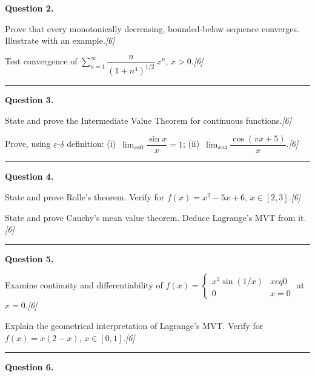 \documentclass[11pt,a4paper]{article}
\newcommand{\pts}[1]{\hfill   \textit{[#1]}}
\begin{document}
\noindent   \textbf{Question 2.}

\begin{parts}
  \item Prove that every monotonically decreasing, bounded-below sequence converges. Illustrate with an example.\pts{6}
  \item Test convergence of $\displaystyle\sum_{n=1}^{\infty}\dfrac{n}{(1+n^4)^{1/2}}\,x^n$, $x>0$.\pts{6}
\end{parts}
\medskip\rule{\linewidth}{0.2pt}

\medskip


\noindent   \textbf{Question 3.}

\begin{parts}
  \item State and prove the Intermediate Value Theorem for continuous functions.\pts{6}
  \item Prove, using $\varepsilon$-$\delta$ definition: (i)~$\lim_{x o0}\dfrac{\sin x}{x}=1$; (ii)~$\lim_{x o4}\dfrac{\cos(\pi x+5)}{x}$.\pts{6}
\end{parts}
\medskip\rule{\linewidth}{0.2pt}

\medskip


\noindent   \textbf{Question 4.}

\begin{parts}
  \item State and prove Rolle's theorem. Verify for $f(x)=x^2-5x+6$, $x\in[2,3]$.\pts{6}
  \item State and prove Cauchy's mean value theorem. Deduce Lagrange's MVT from it.\pts{6}
\end{parts}
\medskip\rule{\linewidth}{0.2pt}

\medskip


\noindent   \textbf{Question 5.}

\begin{parts}
  \item Examine continuity and differentiability of $f(x)=
\begin{cases}x^2\sin(1/x) & x
eq0 \\ 0 & x=0\end{cases}$ at $x=0$.\pts{6}
  \item Explain the geometrical interpretation of Lagrange's MVT. Verify for $f(x)=x(2-x)$, $x\in[0,1]$.\pts{6}
\end{parts}
\medskip\rule{\linewidth}{0.2pt}

\medskip


\noindent   \textbf{Question 6.}
\end{document}
